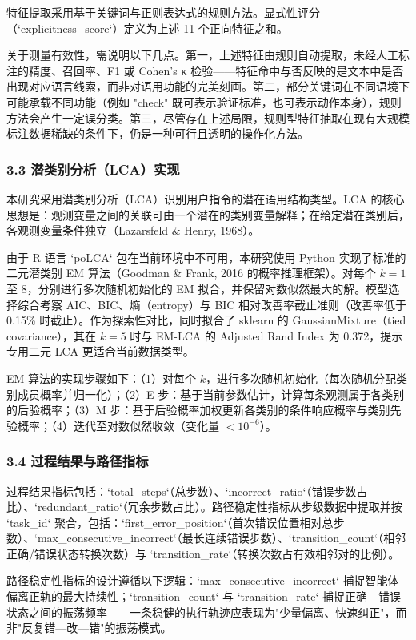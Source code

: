 \documentclass[12pt,a4paper,openany,oneside]{ctexrep}
\begin{document}
特征提取采用基于关键词与正则表达式的规则方法。显式性评分（`explicitness\_score`）定义为上述 11 个正向特征之和。

关于测量有效性，需说明以下几点。第一，上述特征由规则自动提取，未经人工标注的精度、召回率、F1 或 Cohen's κ 检验——特征命中与否反映的是文本中是否出现对应语言线索，而非对语用功能的完美刻画。第二，部分关键词在不同语境下可能承载不同功能（例如 "check" 既可表示验证标准，也可表示动作本身），规则方法会产生一定误分类。第三，尽管存在上述局限，规则型特征抽取在现有大规模标注数据稀缺的条件下，仍是一种可行且透明的操作化方法。

\subsubsection{3.3 潜类别分析（LCA）实现}


本研究采用潜类别分析（LCA）识别用户指令的潜在语用结构类型。LCA 的核心思想是：观测变量之间的关联可由一个潜在的类别变量解释；在给定潜在类别后，各观测变量条件独立（Lazarsfeld \& Henry, 1968）。

由于 R 语言 `poLCA` 包在当前环境中不可用，本研究使用 Python 实现了标准的二元潜类别 EM 算法（Goodman \& Frank, 2016 的概率推理框架）。对每个 $k=1$ 至 8，分别进行多次随机初始化的 EM 拟合，并保留对数似然最大的解。模型选择综合考察 AIC、BIC、熵（entropy）与 BIC 相对改善率截止准则（改善率低于 0.15\% 时截止）。作为探索性对比，同时拟合了 sklearn 的 GaussianMixture（tied covariance），其在 $k=5$ 时与 EM-LCA 的 Adjusted Rand Index 为 0.372，提示专用二元 LCA 更适合当前数据类型。

EM 算法的实现步骤如下：（1）对每个 $k$，进行多次随机初始化（每次随机分配类别成员概率并归一化）；（2）E 步：基于当前参数估计，计算每条观测属于各类别的后验概率；（3）M 步：基于后验概率加权更新各类别的条件响应概率与类别先验概率；（4）迭代至对数似然收敛（变化量 $< 10^{-6}$）。

\subsubsection{3.4 过程结果与路径指标}


过程结果指标包括：`total\_steps`（总步数）、`incorrect\_ratio`（错误步数占比）、`redundant\_ratio`（冗余步数占比）。路径稳定性指标从步级数据中提取并按 `task\_id` 聚合，包括：`first\_error\_position`（首次错误位置相对总步数）、`max\_consecutive\_incorrect`（最长连续错误步数）、`transition\_count`（相邻正确/错误状态转换次数）与 `transition\_rate`（转换次数占有效相邻对的比例）。

路径稳定性指标的设计遵循以下逻辑：`max\_consecutive\_incorrect` 捕捉智能体偏离正轨的最大持续性；`transition\_count` 与 `transition\_rate` 捕捉正确—错误状态之间的振荡频率——一条稳健的执行轨迹应表现为"少量偏离、快速纠正"，而非"反复错—改—错"的振荡模式。
\end{document}
